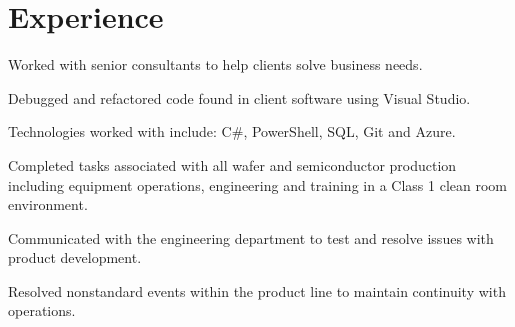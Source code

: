 \documentclass[letterpaper]{deedy-resume} %
\newcommand{\CS}{C\#}
\begin{document}
\begin{minipage}[t]{0.66\textwidth} %


\section{Experience}


\vspace{\topsep} %
\begin{tightitemize}
\item Worked with senior consultants to help clients solve business needs.
\item Debugged and refactored code found in client software using Visual Studio.
\item Technologies worked with include: \CS{}, PowerShell, SQL, Git and Azure.
\end{tightitemize}

\sectionspace %
\vspace{1.5mm}



\vspace{\topsep} %
\begin{tightitemize}
\item Completed tasks associated with all wafer and semiconductor production including equipment operations, engineering and training in a Class 1 clean room environment.
\item Communicated with the engineering department to test and resolve issues with product development.
\item Resolved nonstandard events within the product line to maintain continuity with operations.
\end{tightitemize}

\sectionspace %
\vspace{1.5mm}


\end{minipage}
\end{document}
